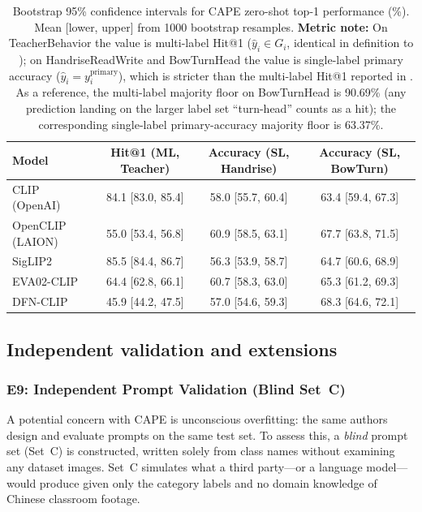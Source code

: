 \documentclass[electronics,article,submit,pdftex,moreauthors]{Definitions/mdpi}
\begin{document}
\begin{table}[H]
\caption{Bootstrap 95\% confidence intervals for CAPE zero-shot top-1 performance (\%). Mean [lower, upper] from 1000 bootstrap resamples. \textbf{Metric note:} On TeacherBehavior the value is multi-label Hit@1 ($\hat{y}_i\in G_i$, identical in definition to ); on HandriseReadWrite and BowTurnHead the value is single-label primary accuracy ($\hat{y}_i=y^{\text{primary}}_i$), which is stricter than the multi-label Hit@1 reported in . As a reference, the multi-label majority floor on BowTurnHead is 90.69\% (any prediction landing on the larger label set ``turn-head'' counts as a hit); the corresponding single-label primary-accuracy majority floor is 63.37\%.}
\label{tab:bootstrap_ci}
\centering
\small
\setlength{\tabcolsep}{3pt}
\begin{tabular}{l ccc}
\toprule
\textbf{Model} & \textbf{Hit@1 (ML, Teacher)} & \textbf{Accuracy (SL, Handrise)} & \textbf{Accuracy (SL, BowTurn)} \\
\midrule
CLIP (OpenAI) & 84.1 [83.0, 85.4] & 58.0 [55.7, 60.4] & 63.4 [59.4, 67.3] \\
OpenCLIP (LAION) & 55.0 [53.4, 56.8] & 60.9 [58.5, 63.1] & 67.7 [63.8, 71.5] \\
SigLIP2 & 85.5 [84.4, 86.7] & 56.3 [53.9, 58.7] & 64.7 [60.6, 68.9] \\
EVA02-CLIP & 64.4 [62.8, 66.1] & 60.7 [58.3, 63.0] & 65.3 [61.2, 69.3] \\
DFN-CLIP & 45.9 [44.2, 47.5] & 57.0 [54.6, 59.3] & 68.3 [64.6, 72.1] \\
\bottomrule
\end{tabular}
\end{table}


\subsection{Independent validation and extensions}

\subsubsection{E9: Independent Prompt Validation (Blind Set~C)}
\label{sec:e9_blind}

A potential concern with CAPE is unconscious overfitting: the same authors design and evaluate prompts on the same test set. To assess this, a \emph{blind} prompt set (Set~C) is constructed, written solely from class names without examining any dataset images. Set~C simulates what a third party---or a language model---would produce given only the category labels and no domain knowledge of Chinese classroom footage.
\end{document}
